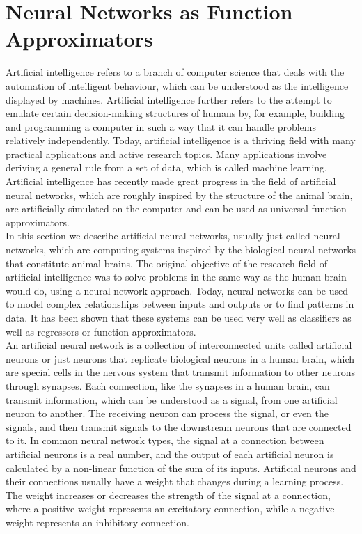 \section{Neural Networks as Function Approximators}
\label{ch1:sec3}

Artificial intelligence refers to a branch of computer science that deals with the automation of intelligent behaviour, which can be understood as the intelligence displayed by machines. Artificial intelligence further refers to the attempt to emulate certain decision-making structures of humans by, for example, building and programming a computer in such a way that it can handle problems relatively independently. Today, artificial intelligence is a thriving field with many practical applications and active research topics. Many applications involve deriving a general rule from a set of data, which is called machine learning. Artificial intelligence has recently made great progress in the field of artificial neural networks, which are roughly inspired by the structure of the animal brain, are artificially simulated on the computer and can be used as universal function approximators. \\
In this section we describe artificial neural networks, usually just called neural networks, which are computing systems inspired by the biological neural networks that constitute animal brains. The original objective of the research field of artificial intelligence was to solve problems in the same way as the human brain would do, using a neural network approach. Today, neural networks can be used to model complex relationships between inputs and outputs or to find patterns in data. It has been shown that these systems can be used very well as classifiers as well as regressors or function approximators. \\
An artificial neural network is a collection of interconnected units called artificial neurons or just neurons that replicate biological neurons in a human brain, which are special cells in the nervous system that transmit information to other neurons through synapses. Each connection, like the synapses in a human brain, can transmit information, which can be understood as a signal, from one artificial neuron to another. The receiving neuron can process the signal, or even the signals, and then transmit signals to the downstream neurons that are connected to it. In common neural network types, the signal at a connection between artificial neurons is a real number, and the output of each artificial neuron is calculated by a non-linear function of the sum of its inputs. Artificial neurons and their connections usually have a weight that changes during a learning process. The weight increases or decreases the strength of the signal at a connection, where a positive weight represents an excitatory connection, while a negative weight represents an inhibitory connection. \\
